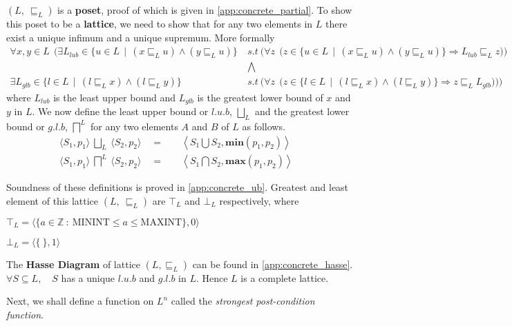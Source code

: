 \documentclass[final,3p, review, times]{util/elsarticle}
\begin{document}
$(L,\ \sqsubseteq_L)$ is a \textbf{poset}, proof of which is given in \ref{app:concrete_partial}. To show this poset to be a \textbf{lattice}, we need to show that for any two elements in $L$ there exist a unique infimum and a unique supremum. More formally
\begin{align*}
  \forall x,y\in L\ \ \Bigg(\exists L_{lub}\in\Big\{u\in L\ \ \big|\ \ (x\sqsubseteq_L u)\land(y\sqsubseteq_L u)\Big\}\ &s.t\ \bigg(\forall z\ \ \Big(z\in\Big\{u\in L\ \ \big|\ \ (x\sqsubseteq_L u)\land(y\sqsubseteq_L u)\Big\} \Rightarrow L_{lub}\sqsubseteq_L z\Big)\bigg)\\
  &\bigwedge\\
  \exists L_{glb}\in\Big\{l\in L\ \ \big|\ \ (l\sqsubseteq_L x)\land(l\sqsubseteq_L y)\Big\}\ &s.t\ \bigg(\forall z\ \ \Big(z\in\Big\{l\in L\ \ \big|\ \ (l\sqsubseteq_L x)\land(l\sqsubseteq_L y)\Big\} \Rightarrow z\sqsubseteq_L L_{glb}\Big)\bigg)\Bigg)
\end{align*}
where $L_{lub}$ is the least upper bound and $L_{glb}$ is the greatest lower bound of $x$ and $y$ in $L$. We now define the least upper bound or $l.u.b$, $\displaystyle\bigsqcup_L$ and the greatest lower bound or $g.l.b$, $\displaystyle\bigsqcap^L$ for any two elements $A$ and $B$ of $L$ as follows.
\begin{align}
    \langle S_1,p_1\rangle\ \bigsqcup_L\ \langle S_2,p_2\rangle\quad=\quad&\left\langle S_1\bigcup S_2, \textbf{min}(p_1,p_2)\right\rangle&\label{eq:lub_L}\\
    \langle S_1,p_1\rangle\ \bigsqcap^L\ \langle S_2,p_2\rangle\quad=\quad&\left\langle S_1\bigcap S_2, \textbf{max}(p_1,p_2)\right\rangle&\label{eq:glb_L}
\end{align}

Soundness of these definitions is proved in \ref{app:concrete_ub}. Greatest and least element of this lattice $(L,\ \sqsubseteq_L)$ are $\top_L$ and $\bot_L$ respectively, where

$\top_L=\langle\{a\in\mathbb{Z}\ :\ \mathrm{MININT}\leq a\leq\mathrm{MAXINT}\}, 0\rangle$

$\bot_L=\langle\{\ \}, 1\rangle$

The \textbf{Hasse Diagram} of lattice $(L,\sqsubseteq_L)$ can be found in \ref{app:concrete_hasse}. $\forall S\subseteq L,\quad S$ has a unique $l.u.b$ and $g.l.b$ in $L$. Hence $L$ is a complete lattice.

Next, we shall define a function on $L^n$ called the \textit{strongest post-condition function}\cite{lara13}.
\end{document}
